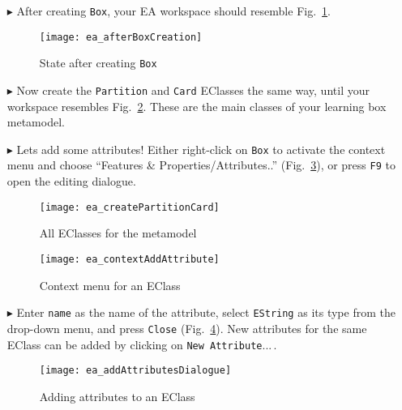 \begin{itemize}
\item[$\blacktriangleright$] After creating \texttt{Box}, your EA workspace should resemble Fig.~\ref{ea:eclass_completed}.

\vspace{0.5cm}

\begin{figure}[htbp]
	\centering
  \texttt{[image: ea\_afterBoxCreation]}
	\caption{State after creating \texttt{Box}}
	\label{ea:eclass_completed}
\end{figure}

\item[$\blacktriangleright$] Now create the \texttt{Partition} and \texttt{Card} EClasses the same way, until your workspace resembles
Fig.~\ref{ea:all_eclasses}. These are the main classes of your learning box metamodel.

\vspace{0.5cm}

\item[$\blacktriangleright$] Lets add some attributes! Either right-click on \texttt{Box} to activate the context menu and choose ``Features \&
Properties/Attributes..'' (Fig.~\ref{ea:attribute}), or press \texttt{F9} to open the editing dialogue.

\begin{figure}[htbp]
	\centering
  \texttt{[image: ea\_createPartitionCard]}
	\caption{All EClasses for the metamodel}
	\label{ea:all_eclasses}
\end{figure}

\begin{figure}[htbp]
	\centering
  \texttt{[image: ea\_contextAddAttribute]}
	\caption{Context menu for an EClass}
	\label{ea:attribute}
\end{figure}
\FloatBarrier

\item[$\blacktriangleright$] Enter \texttt{name} as the name of the attribute, select \texttt{EString} as its type from the drop-down menu, and press
\texttt{Close} (Fig.~\ref{ea:attribute_properties}). New attributes for the same EClass can be added by clicking on \texttt{New Attribute}...\,.

\vspace{1.0cm}

\begin{figure}[htbp]
	\centering
  \texttt{[image: ea\_addAttributesDialogue]}
	\caption{Adding attributes to an EClass}
	\label{ea:attribute_properties}
\end{figure}


\end{itemize}
